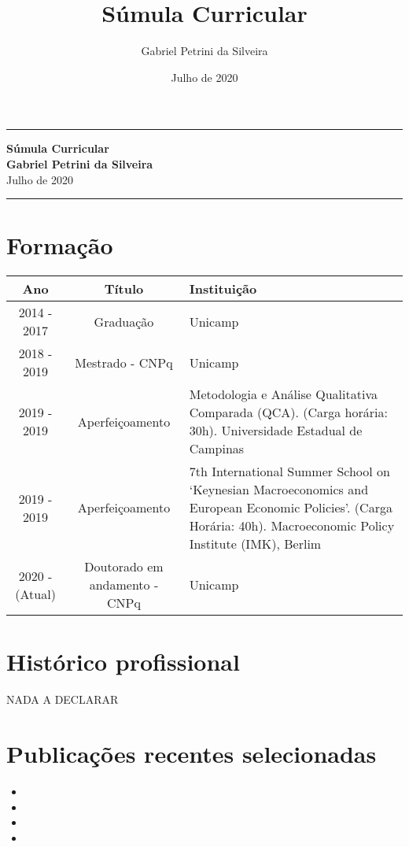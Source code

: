 \documentclass[11pt,a4paper]{article}
\author{Gabriel Petrini da Silveira}
\title{Súmula Curricular}
\date{Julho de 2020}
\begin{document}
\begin{center}
	\rule{\textwidth}{1.2pt}
	\textbf{Súmula Curricular}\\
	\Large\textbf{Gabriel Petrini da Silveira}\\
	Julho de 2020
	\rule{\textwidth}{1.2pt}
\end{center}

\section{Formação}

\begin{center}
\begin{tabularx}{\textwidth}{c|c|X}
	\hline \hline 
	\textbf{Ano} & \textbf{Título} & \textbf{Instituição} \\ 
	\hline 
	2014 - 2017 & Graduação & Unicamp \\ \hline 
	2018 - 2019 & Mestrado - CNPq & Unicamp \\ \hline 
	2019 - 2019 & Aperfeiçoamento & Metodologia e Análise Qualitativa Comparada (QCA). (Carga horária: 30h). Universidade Estadual de Campinas\\ \hline
	2019 - 2019 & Aperfeiçoamento &  7th International Summer School on `Keynesian Macroeconomics and European Economic Policies'. (Carga Horária: 40h). Macroeconomic Policy Institute
	(IMK), Berlim \\ \hline
	2020 - (Atual) & Doutorado em andamento - CNPq & Unicamp \\ 
	\hline \hline 
\end{tabularx} 
\end{center}

\section{Histórico profissional}

NADA A DECLARAR


\section{Publicações recentes selecionadas}


\begin{itemize}
	\item {}
	\item {}
	\item {}
	\item {}
\end{itemize}
	
\end{document}
